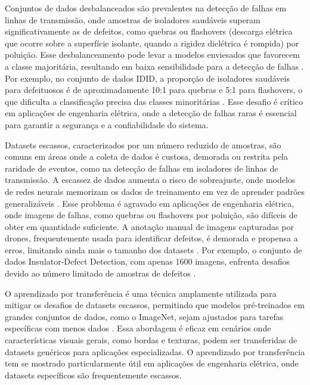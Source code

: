 Conjuntos de dados desbalanceados são prevalentes na detecção de falhas em linhas de transmissão, onde amostras de isoladores saudáveis superam significativamente as de defeitos, como quebras ou flashovers (descarga elétrica que ocorre sobre a superfície isolante, quando a rigidez dielétrica é rompida) por poluição. Esse desbalanceamento pode levar a modelos enviesados que favorecem a classe majoritária, resultando em baixa sensibilidade para a detecção de falhas \cite{he2009learning}. Por exemplo, no conjunto de dados IDID, a proporção de isoladores saudáveis para defeituosos é de aproximadamente 10:1 para quebras e 5:1 para flashovers, o que dificulta a classificação precisa das classes minoritárias \cite{oberweger2024xai}. Esse desafio é crítico em aplicações de engenharia elétrica, onde a detecção de falhas raras é essencial para garantir a segurança e a confiabilidade do sistema.

Datasets escassos, caracterizados por um número reduzido de amostras, são comuns em áreas onde a coleta de dados é custosa, demorada ou restrita pela raridade de eventos, como na detecção de falhas em isoladores de linhas de transmissão. A escassez de dados aumenta o risco de sobreajuste, onde modelos de redes neurais memorizam os dados de treinamento em vez de aprender padrões generalizáveis \cite{goodfellow2016deep}. Esse problema é agravado em aplicações de engenharia elétrica, onde imagens de falhas, como quebras ou flashovers por poluição, são difíceis de obter em quantidade suficiente. A anotação manual de imagens capturadas por drones, frequentemente usada para identificar defeitos, é demorada e propensa a erros, limitando ainda mais o tamanho dos datasets \cite{zheng2022improved}. Por exemplo, o conjunto de dados Insulator-Defect Detection, com apenas 1600 imagens, enfrenta desafios devido ao número limitado de amostras de defeitos \cite{zheng2022improved}.

O aprendizado por transferência é uma técnica amplamente utilizada para mitigar os desafios de datasets escassos, permitindo que modelos pré-treinados em grandes conjuntos de dados, como o ImageNet, sejam ajustados para tarefas específicas com menos dados \cite{pan2010survey}. Essa abordagem é eficaz em cenários onde características visuais gerais, como bordas e texturas, podem ser transferidas de datasets genéricos para aplicações especializadas. O aprendizado por transferência tem se mostrado particularmente útil em aplicações de engenharia elétrica, onde datasets específicos são frequentemente escassos.

